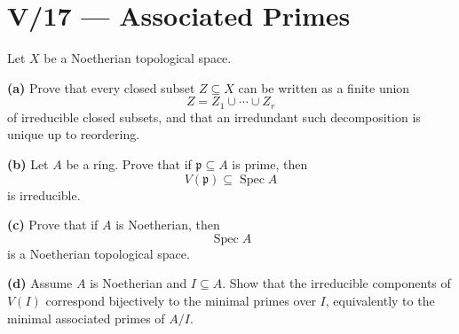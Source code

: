 \section*{V/17 --- Associated Primes}

\begin{problem}[CP-V-0026]
\label{prob:cp-v-0026}
Let \(X\) be a Noetherian topological space.

\textbf{(a)} Prove that every closed subset \(Z\subseteq X\) can be written as a
finite union
\[
Z=Z_1\cup\cdots\cup Z_r
\]
of irreducible closed subsets, and that an irredundant such decomposition is
unique up to reordering.

\textbf{(b)} Let \(A\) be a ring. Prove that if \(\mathfrak p\subseteq A\) is
prime, then
\[
V(\mathfrak p)\subseteq\operatorname{Spec}A
\]
is irreducible.

\textbf{(c)} Prove that if \(A\) is Noetherian, then
\[
\operatorname{Spec}A
\]
is a Noetherian topological space.

\textbf{(d)} Assume \(A\) is Noetherian and \(I\subseteq A\). Show that the
irreducible components of \(V(I)\) correspond bijectively to the minimal
primes over \(I\), equivalently to the minimal associated primes of \(A/I\).
\end{problem}

